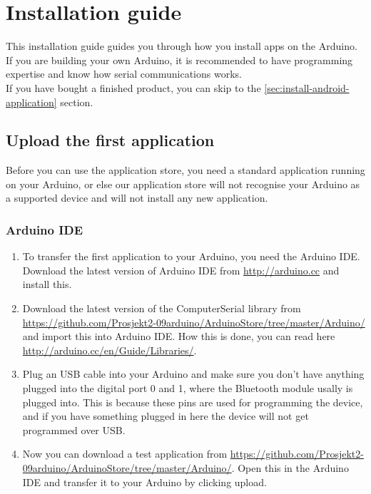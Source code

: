 \chapter{Installation guide}
This installation guide guides you through how you install apps on the Arduino. If you are building your own Arduino, it is recommended to have programming expertise and know how serial communications works.\\

If you have bought a finished product, you can skip to the \ref{sec:install-android-application} section.

	\section{Upload the first application}
	Before you can use the application store, you need a standard application running on your Arduino, or else our application store will not recognise your Arduino as a supported device and will not install any new application.
	
		\subsection{Arduino IDE}
		\begin{enumerate}
		\item To transfer the first application to your Arduino, you need the Arduino IDE. Download the latest version of Arduino IDE from \url{http://arduino.cc} and install this.
	
		\item Download the latest version of the ComputerSerial library from \url{https://github.com/Prosjekt2-09arduino/ArduinoStore/tree/master/Arduino/} and import this into Arduino IDE. How this is done, you can read here \url{http://arduino.cc/en/Guide/Libraries/}.
	
		\item Plug an USB cable into your Arduino and make sure you don't have anything plugged into the digital port 0 and 1, where the Bluetooth module usally is plugged into. This is because these pins are used for programming the device, and if you have something plugged in here the device will not get programmed over USB.
		
		\item Now you can download a test application from \url{https://github.com/Prosjekt2-09arduino/ArduinoStore/tree/master/Arduino/}. Open this in the Arduino IDE and transfer it to your Arduino by clicking upload.
		\end{enumerate}
		
